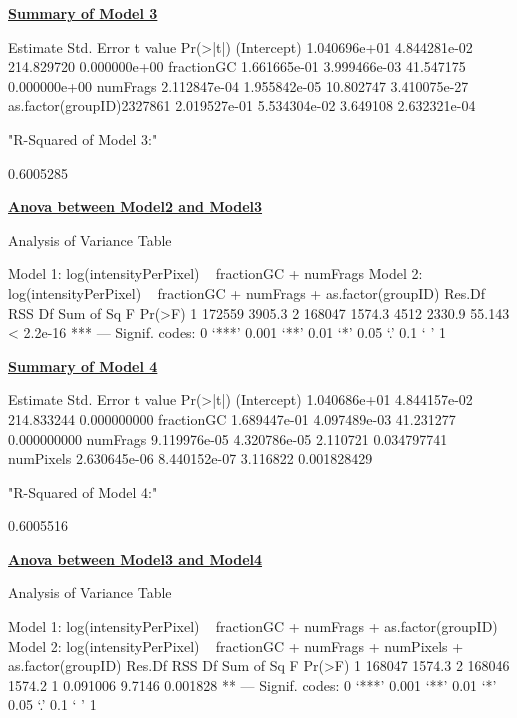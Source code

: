 \documentclass[11pt]{article}
\begin{document}
\noindent
{\bf{\underline{Summary of Model 3}}}
\begin{Schunk}
\begin{Soutput}
                              Estimate   Std. Error    t value     Pr(>|t|)
(Intercept)               1.040696e+01 4.844281e-02 214.829720 0.000000e+00
fractionGC                1.661665e-01 3.999466e-03  41.547175 0.000000e+00
numFrags                  2.112847e-04 1.955842e-05  10.802747 3.410075e-27
as.factor(groupID)2327861 2.019527e-01 5.534304e-02   3.649108 2.632321e-04
\end{Soutput}
\begin{Soutput}
[1] "R-Squared of Model 3:"
\end{Soutput}
\begin{Soutput}
[1] 0.6005285
\end{Soutput}
\end{Schunk}

\noindent
{\bf{\underline{Anova between Model2 and Model3}}}
\begin{Schunk}
\begin{Soutput}
Analysis of Variance Table

Model 1: log(intensityPerPixel) ~ fractionGC + numFrags
Model 2: log(intensityPerPixel) ~ fractionGC + numFrags + as.factor(groupID)
  Res.Df    RSS   Df Sum of Sq      F    Pr(>F)    
1 172559 3905.3                                    
2 168047 1574.3 4512    2330.9 55.143 < 2.2e-16 ***
---
Signif. codes:  0 ‘***’ 0.001 ‘**’ 0.01 ‘*’ 0.05 ‘.’ 0.1 ‘ ’ 1 
\end{Soutput}
\end{Schunk}

\noindent
{\bf{\underline{Summary of Model 4}}}
\begin{Schunk}
\begin{Soutput}
                Estimate   Std. Error    t value    Pr(>|t|)
(Intercept) 1.040686e+01 4.844157e-02 214.833244 0.000000000
fractionGC  1.689447e-01 4.097489e-03  41.231277 0.000000000
numFrags    9.119976e-05 4.320786e-05   2.110721 0.034797741
numPixels   2.630645e-06 8.440152e-07   3.116822 0.001828429
\end{Soutput}
\begin{Soutput}
[1] "R-Squared of Model 4:"
\end{Soutput}
\begin{Soutput}
[1] 0.6005516
\end{Soutput}
\end{Schunk}

\noindent
{\bf{\underline{Anova between Model3 and Model4}}}
\begin{Schunk}
\begin{Soutput}
Analysis of Variance Table

Model 1: log(intensityPerPixel) ~ fractionGC + numFrags + as.factor(groupID)
Model 2: log(intensityPerPixel) ~ fractionGC + numFrags + numPixels + 
    as.factor(groupID)
  Res.Df    RSS Df Sum of Sq      F   Pr(>F)   
1 168047 1574.3                                
2 168046 1574.2  1  0.091006 9.7146 0.001828 **
---
Signif. codes:  0 ‘***’ 0.001 ‘**’ 0.01 ‘*’ 0.05 ‘.’ 0.1 ‘ ’ 1 
\end{Soutput}
\end{Schunk}
\end{document}
